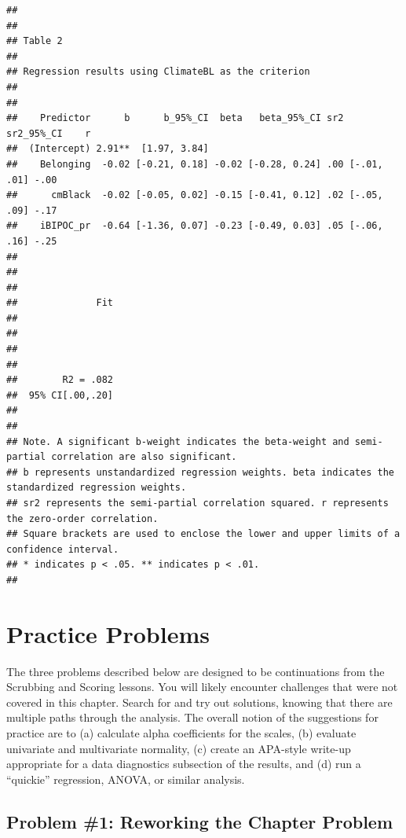 \documentclass[
  11pt,
]{book}
\begin{document}
\begin{verbatim}
## 
## 
## Table 2 
## 
## Regression results using ClimateBL as the criterion
##  
## 
##    Predictor      b      b_95%_CI  beta   beta_95%_CI sr2  sr2_95%_CI    r
##  (Intercept) 2.91**  [1.97, 3.84]                                         
##    Belonging  -0.02 [-0.21, 0.18] -0.02 [-0.28, 0.24] .00 [-.01, .01] -.00
##      cmBlack  -0.02 [-0.05, 0.02] -0.15 [-0.41, 0.12] .02 [-.05, .09] -.17
##    iBIPOC_pr  -0.64 [-1.36, 0.07] -0.23 [-0.49, 0.03] .05 [-.06, .16] -.25
##                                                                           
##                                                                           
##                                                                           
##              Fit
##                 
##                 
##                 
##                 
##        R2 = .082
##  95% CI[.00,.20]
##                 
## 
## Note. A significant b-weight indicates the beta-weight and semi-partial correlation are also significant.
## b represents unstandardized regression weights. beta indicates the standardized regression weights. 
## sr2 represents the semi-partial correlation squared. r represents the zero-order correlation.
## Square brackets are used to enclose the lower and upper limits of a confidence interval.
## * indicates p < .05. ** indicates p < .01.
## 
\end{verbatim}

\hypertarget{practice-problems-2}{%
\section{Practice Problems}\label{practice-problems-2}}

The three problems described below are designed to be continuations from the Scrubbing and Scoring lessons. You will likely encounter challenges that were not covered in this chapter. Search for and try out solutions, knowing that there are multiple paths through the analysis. The overall notion of the suggestions for practice are to (a) calculate alpha coefficients for the scales, (b) evaluate univariate and multivariate normality, (c) create an APA-style write-up appropriate for a data diagnostics subsection of the results, and (d) run a ``quickie'' regression, ANOVA, or similar analysis.

\hypertarget{problem-1-reworking-the-chapter-problem-1}{%
\subsection{Problem \#1: Reworking the Chapter Problem}\label{problem-1-reworking-the-chapter-problem-1}}
\end{document}
